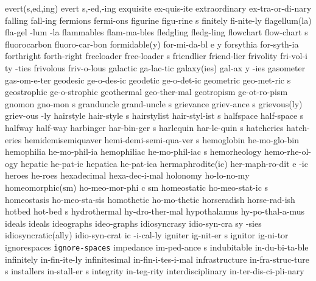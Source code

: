 \2 evert(s,ed,ing)	evert s,-ed,-ing
\1 exquisite		ex-quis-ite
\1 extraordinary	ex-tra-or-di-nary
\1 falling		fall-ing		%
\1 fermions		fermi-ons
\NewWordtrue
\5 figurine		figu-rine s		%
\1 finitely		fi-nite-ly		%
\3 flagellum(la)	fla-gel -lum -la
\1 flammables		flam-ma-bles
\1 fledgling		fledg-ling
\5 flowchart		flow-chart s
\1 fluorocarbon		fluoro-car-bon		%
\3 formidable(y)	for-mi-da-bl e y
\1 forsythia		for-syth-ia
\1 forthright		forth-right
\5 freeloader		free-loader s
\1 friendlier		friend-lier
\6 frivolity		fri-vol-i ty -ties
\1 frivolous		friv-o-lous
\1 galactic		ga-lac-tic
\3 galaxy(ies)		gal-ax y -ies
\1 gasometer		gas-om-e-ter
\1 geodesic		ge-o-des-ic
\1 geodetic		ge-o-det-ic
\5 geometric		geo-met-ric s
\1 geostrophic          ge-o-strophic		%
\1 geothermal		geo-ther-mal		%
\1 geotropism		ge-ot-ro-pism
\5 gnomon		gno-mon s
\5 granduncle		grand-uncle s		%
\5 grievance		griev-ance s
\2 grievous(ly) 	griev-ous -ly
\5 hairstyle		hair-style s
\5 hairstylist		hair-styl-ist s
\5 halfspace		half-space s            %
\1 halfway		half-way		%
\5 harbinger		har-bin-ger s
\5 harlequin		har-le-quin s
\1 hatcheries		hatch-eries
\5 hemidemisemiquaver	hemi-demi-semi-qua-ver s	%
\1 hemoglobin		he-mo-glo-bin
\1 hemophilia		he-mo-phil-ia
\5 hemophiliac		he-mo-phil-iac s	%
\1 hemorheology 	hemo-rhe-ol-ogy
\1 hepatic		he-pat-ic
\NewWordtrue
\1 hepatica		he-pat-ica		%
\3 hermaphrodite(ic)	her-maph-ro-dit e -ic
\1 heroes		he-roes
\1 hexadecimal		hexa-dec-i-mal
\1 holonomy		ho-lo-no-my
\3 homeomorphic(sm)	ho-meo-mor-phi c sm	%
\NewWordtrue
\5 homeostatic		ho-meo-stat-ic s	%
\NewWordtrue
\1 homeostasis		ho-meo-sta-sis		%
\1 homothetic		ho-mo-thetic
\1 horseradish		horse-rad-ish
\5 hotbed		hot-bed s		%
\1 hydrothermal		hy-dro-ther-mal		%
\1 hypothalamus 	hy-po-thal-a-mus 
\1 ideals		ideals
\1 ideographs		ideo-graphs
\6 idiosyncrasy 	idio-syn-cra sy -sies
\3 idiosyncratic(ally)	idio-syn-crat ic -i-cal-ly
\5 igniter		ig-nit-er s
\1 ignitor		ig-ni-tor
\1 ignorespaces 	{\tt\bs ignore-spaces}
\5 impedance		im-ped-ance s
\1 indubitable		in-du-bi-ta-ble		%
\1 infinitely		in-fin-ite-ly
\1 infinitesimal	in-fin-i-tes-i-mal
\5 infrastructure	in-fra-struc-ture s
\5 installers		in-stall-er s		%
\1 integrity		in-teg-rity		%
\1 interdisciplinary	in-ter-dis-ci-pli-nary
